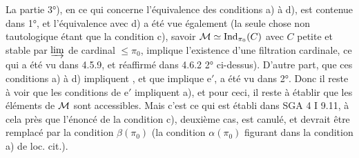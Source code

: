 La partie 3°), en ce qui concerne l'équivalence des conditions a) à d), est contenue dans 1°, et l'équivalence avec d) a été vue également (la seule chose non tautologique étant que la condition c), savoir $\mathcal{M} \simeq \mathrm{Ind}_{\pi_0}(C)$ avec $C$ petite et stable par $\varinjlim$ de cardinal $\leqslant \pi_0$, implique l'existence d'une filtration cardinale, ce qui a été vu dans 4.5.9, et réaffirmé dans 4.6.2 2° ci-dessus). D'autre part, que ces conditions a) à d) impliquent  , et que  implique e$'$, a été vu dans 2°. Donc il reste à voir que les conditions de e$'$ impliquent a), et pour ceci, il reste à établir que les éléments de $\mathcal{M}$ sont accessibles. Mais c'est ce qui est établi dans SGA 4 I 9.11, à cela près que l'énoncé de la condition c), deuxième cas, est canulé, et devrait être remplacé par la condition $\beta(\pi_0)$ (la condition $\alpha(\pi_0)$ figurant dans la condition a) de loc. cit.).


